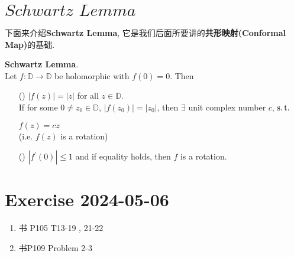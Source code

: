 \newpage
\section{$Schwartz \,\, Lemma$}
	下面来介绍\textbf{Schwartz Lemma}, 它是我们后面所要讲的\textbf{共形映射(Conformal Map)}的基础.
	\begin{thm}\label{thm 11.3.1}
		\textbf{Schwartz Lemma}. \\
		Let $f : \mathbb{D} \rightarrow \mathbb{D}$ be holomorphic with $f(0) = 0$. Then
		
		\vspace*{1em}
		
		\begin{enumerate}
			\item[(\rmnum{1})] $\left| f(z) \right| = \left| z \right|$ for all $z \in \mathbb{D}$. \\
			If for some $0 \neq z_0 \in \mathbb{D}$, $\left| f(z_0) \right| = \left| z_0 \right|$, then $\exists$ unit complex number $c$, $\operatorname{s.t.}$
			\begin{center}
				$f(z) = cz$ \\
				(i.e. $f(z)$ is a rotation)
			\end{center}
			
			\vspace*{2em}
			
			\item[(\rmnum{2})] $\left| f^{'}(0) \right| \leq 1$ and if equality holds, then $f$ is a rotation.
		\end{enumerate}
	\end{thm}

\newpage
\section{Exercise 2024-05-06}
	\begin{enumerate}
		\item 书 P105 T13-19 , 21-22
		
		\item 书P109 Problem 2-3
	\end{enumerate}
	






	\ifx\allfiles\undefined

\fi